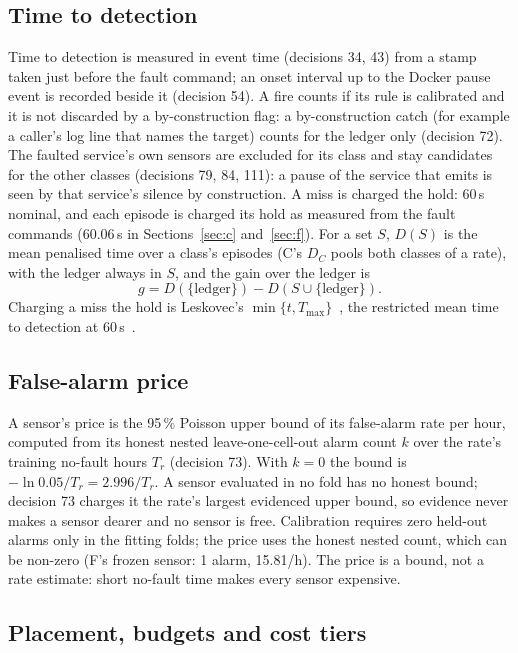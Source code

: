 \documentclass{ceurart}
\begin{document}
\subsection{Time to detection}\label{sec:ttd}
Time to detection is measured in event time (decisions 34, 43) from a stamp taken just before the fault command;
an onset interval up to the Docker pause event is recorded beside it (decision 54). A fire counts if its rule is calibrated
and it is not discarded by a by-construction flag: a by-construction catch (for example a caller's log line that names
the target) counts for the ledger only (decision 72). The faulted service's
own sensors are excluded for its class and stay candidates for the other classes (decisions 79, 84, 111): a pause of
the service that emits is seen by that service's silence by construction. A miss is charged the hold: 60\,s nominal, and
each episode is charged its hold as measured from the fault commands (60.06\,s in Sections~\ref{sec:c} and~\ref{sec:f}). For a set
$S$, $D(S)$ is the mean penalised time over a class's episodes (C's $D_C$ pools both classes of a rate),
with the ledger always in $S$, and the gain
over the ledger is
\[ g = D(\{\text{ledger}\}) - D(S \cup \{\text{ledger}\}). \]
Charging a miss the hold is Leskovec's $\min\{t, T_{\max}\}$~\cite{leskovec_cost-effective_2007}, the restricted mean
time to detection at 60\,s~\cite{royston2013restricted}.

\subsection{False-alarm price}\label{sec:price}
A sensor's price is the 95\,\% Poisson upper bound of its false-alarm rate per hour, computed from its honest nested
leave-one-cell-out alarm count $k$ over the rate's training no-fault hours $T_r$ (decision 73). With $k = 0$ the bound is $-\ln 0.05 / T_r = 2.996/T_r$. A sensor evaluated in no fold
has no honest bound; decision 73 charges it the rate's largest evidenced upper bound, so evidence never makes a sensor
dearer and no sensor is free. Calibration requires zero held-out alarms only in the fitting folds; the price uses the honest nested count, which can
be non-zero (F's frozen sensor: 1 alarm, 15.81/h). The price is a bound, not a rate
estimate: short no-fault time makes every sensor expensive.

\subsection{Placement, budgets and cost tiers}\label{sec:placement}
\end{document}
